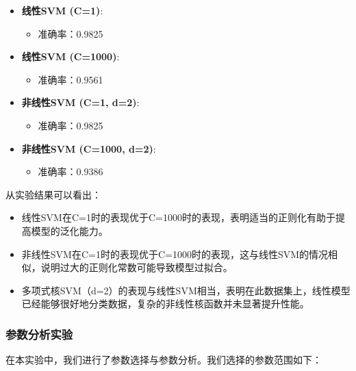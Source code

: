 \documentclass[12pt]{article}
\begin{document}
\begin{itemize}
  \item \textbf{线性SVM (C=1)}:
        \begin{itemize}
          \item 准确率：0.9825
        \end{itemize}

  \item \textbf{线性SVM (C=1000)}:
        \begin{itemize}
          \item 准确率：0.9561
        \end{itemize}

  \item \textbf{非线性SVM (C=1, d=2)}:
        \begin{itemize}
          \item 准确率：0.9825
        \end{itemize}

  \item \textbf{非线性SVM (C=1000, d=2)}:
        \begin{itemize}
          \item 准确率：0.9386
        \end{itemize}
\end{itemize}

从实验结果可以看出：
\begin{itemize}
  \item 线性SVM在C=1时的表现优于C=1000时的表现，表明适当的正则化有助于提高模型的泛化能力。
  \item 非线性SVM在C=1时的表现优于C=1000时的表现，这与线性SVM的情况相似，说明过大的正则化常数可能导致模型过拟合。
  \item 多项式核SVM（d=2）的表现与线性SVM相当，表明在此数据集上，线性模型已经能够很好地分类数据，复杂的非线性核函数并未显著提升性能。
\end{itemize}


\subsubsection{参数分析实验}

在本实验中，我们进行了参数选择与参数分析。我们选择的参数范围如下：
\end{document}
